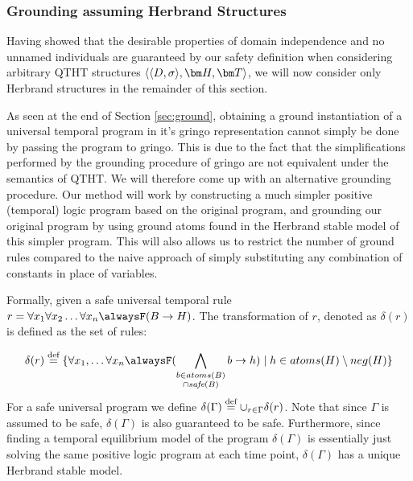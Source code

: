 \subsubsection{Grounding assuming Herbrand Structures}
Having showed that the desirable properties of domain independence and
no unnamed individuals are guaranteed by our safety definition when
considering arbitrary QTHT structures $\qthandt$, we will now consider
only Herbrand structures in the remainder of this section.

As seen at the end of Section \ref{sec:ground}, obtaining a ground
instantiation of a universal temporal program in it's gringo
representation cannot simply be done by passing the program to
gringo. This is due to the fact that the simplifications performed by
the grounding procedure of gringo are not equivalent under the
semantics of QTHT. We will therefore come up with an alternative
grounding procedure. Our method will work by constructing a much
simpler positive (temporal) logic program based on the original
program, and grounding our original program by using ground atoms
found in the Herbrand stable model of this simpler program. This will
also allows us to restrict the number of ground rules compared to the
naive approach of simply substituting any combination of constants in
place of variables.



Formally, given a safe universal temporal rule
$r=\forallx \alwaysF(B \rightarrow H)$. The
transformation of $r$, denoted as $\delta(r)$ is defined as the set of
rules:

\begin{equation*} \delta(r) \defeq \{ \forall x_1, \dots \forall x_n
  \alwaysF(\bigwedge_{\substack{b \in atoms(B)\\ \cap \safe{B}}}b
  \rightarrow h) \mid h \in atoms(H) \setminus neg(H)\}
\end{equation*}
For a safe universal program we define
$\delta (\Gamma) \stackrel{\text{def}}{=} \cup_{r \in \Gamma} \delta(r)$. Note that
since $\Gamma$ is assumed to be safe, $\delta(\Gamma)$ is also
guaranteed to be safe. Furthermore, since finding a temporal
equilibrium model of the program $\delta(\Gamma)$ is essentially just
solving the same positive logic program at each time point,
$\delta(\Gamma)$ has a unique Herbrand stable model.

